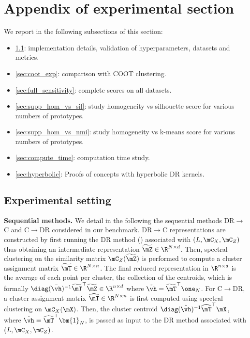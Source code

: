 \section{Appendix of experimental section}\label{sec:appendix_exps}

We report in the following subsections of this section:
\begin{itemize}
	\item \ref{sec:implementation_details}: implementation details, validation of hyperparameters, datasets and metrics.
	\item \ref{sec:coot_exp}: comparison with COOT clustering.
	\item \ref{sec:full_sensitivity}: complete scores on all datasets.
	\item \ref{sec:supp_hom_vs_sil}: study homogeneity vs silhouette score for various numbers of prototypes.
	\item \ref{sec:supp_hom_vs_nmi}: study homogeneity vs k-means score for various numbers of prototypes.
	\item \ref{sec:compute_time}: computation time study.
	\item \ref{sec:hyperbolic}: Proofs of concepts with hyperbolic DR kernels.
\end{itemize}

\subsection{Experimental setting}\label{sec:implementation_details}

\textbf{Sequential methods.} We detail in the following the sequential methods DR$\to$C and C$\to$DR considered in our benchmark. DR$\to$C representations are constructed by first running the DR method () associated with $(L, \mC_X, \mC_Z)$ thus obtaining an intermediate representation $\widetilde{\mZ} \in \R^{N \times d}$. Then, spectral clustering \cite{von2007tutorial} on the similarity matrix $\mC_Z(\widetilde{\mZ})$ is performed to compute a cluster assignment matrix $\widetilde{\mT} \in \R^{N \times n}$. The final reduced representation in $\R^{n \times d}$ is the average of each point per cluster, \ie the collection of the centroids, which is formally $\diag(\tilde{\vh})^{-1} \widetilde{\mT}^\top \widetilde{\mZ} \in \R^{n \times d}$ where $\tilde{\vh} = \widetilde{\mT}^\top \one_N$.
For C$\to$DR, a cluster assignment matrix $\widehat{\mT} \in \R^{N \times n}$ is first computed using spectral clustering on $\mC_X(\mX)$.
Then, the cluster centroid $\diag(\hat{\vh})^{-1} \widehat{\mT}^\top \mX$, where $\hat{\vh} = \widehat{\mT}^\top \bm{1}_N$, is passed as input to the DR method associated with $(L, \mC_X, \mC_Z)$.

